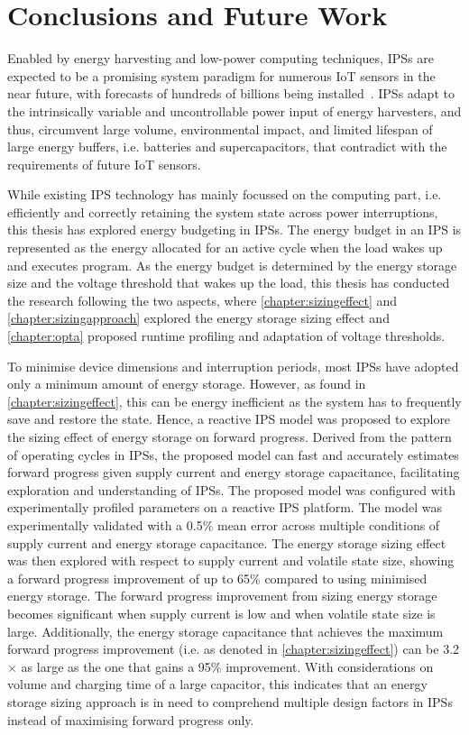\chapter{Conclusions and Future Work} \label{chapter:conclusion}

Enabled by energy harvesting and low-power computing techniques, IPSs are expected to be a promising system paradigm for numerous IoT sensors in the near future, with forecasts of hundreds of billions being installed~\cite{sparks2017trillion}.
IPSs adapt to the intrinsically variable and uncontrollable power input of energy harvesters, and thus, circumvent large volume, environmental impact, and limited lifespan of large energy buffers, i.e. batteries and supercapacitors, that contradict with the requirements of future IoT sensors.

While existing IPS technology has mainly focussed on the computing part, i.e. efficiently and correctly retaining the system state across power interruptions, this thesis has explored energy budgeting in IPSs. 
The energy budget in an IPS is represented as the energy allocated for an active cycle when the load wakes up and executes program. 
As the energy budget is determined by the energy storage size and the voltage threshold that wakes up the load, this thesis has conducted the research following the two aspects, where \cref{chapter:sizingeffect} and \cref{chapter:sizingapproach} explored the energy storage sizing effect and \cref{chapter:opta} proposed runtime profiling and adaptation of voltage thresholds. 

To minimise device dimensions and interruption periods, most IPSs have adopted only a minimum amount of energy storage. 
However, as found in \cref{chapter:sizingeffect}, this can be energy inefficient as the system has to frequently save and restore the state. 
Hence, a reactive IPS model was proposed to explore the sizing effect of energy storage on forward progress. 
Derived from the pattern of operating cycles in IPSs, the proposed model can fast and accurately estimates forward progress given supply current and energy storage capacitance, facilitating exploration and understanding of IPSs. 
The proposed model was configured with experimentally profiled parameters on a reactive IPS platform.
The model was experimentally validated with a 0.5\% mean error across multiple conditions of supply current and energy storage capacitance. 
The energy storage sizing effect was then explored with respect to supply current and volatile state size, showing a forward progress improvement of up to 65\% compared to using minimised energy storage.
The forward progress improvement from sizing energy storage becomes significant when supply current is low and when volatile state size is large. 
Additionally, the energy storage capacitance that achieves the maximum forward progress improvement (i.e.  as denoted in \cref{chapter:sizingeffect}) can be 3.2$\times$ as large as the one that gains a 95\% improvement. 
With considerations on volume and charging time of a large capacitor, this indicates that an energy storage sizing approach is in need to comprehend multiple design factors in IPSs instead of maximising forward progress only.

